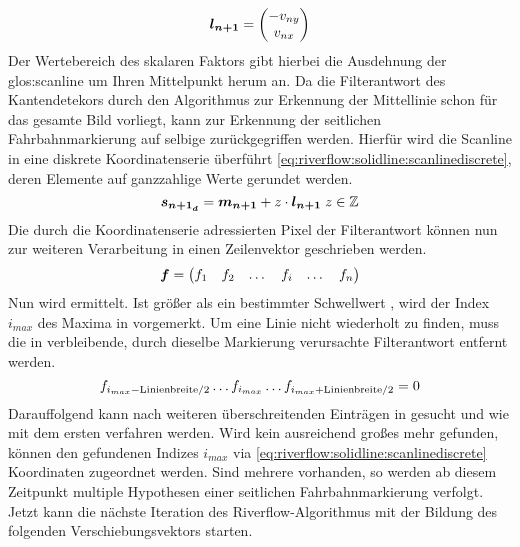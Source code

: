 \begin{equation}
\label{eq:riverflow:solidline:scanlinedirectionvec}
\boldsymbol{l_{n+1}} =
\begin{pmatrix}
-v_{ny} \\
v_{nx}
\end{pmatrix}
\end{equation}
Der Wertebereich des skalaren Faktors \scl{\alpha} gibt hierbei die Ausdehnung der \gls{glos:scanline} um Ihren Mittelpunkt  herum an.
Da die Filterantwort des Kantendetekors durch den Algorithmus zur Erkennung der Mittellinie schon für das gesamte Bild vorliegt, kann zur Erkennung der seitlichen Fahrbahnmarkierung auf selbige zurückgegriffen werden. Hierfür wird die Scanline in eine diskrete Koordinatenserie überführt \ref{eq:riverflow:solidline:scanlinediscrete}, deren Elemente auf ganzzahlige Werte gerundet werden.
\begin{equation}
\label{eq:riverflow:solidline:scanlinediscrete}
\boldsymbol{s_{{n+1}_d}} =
\boldsymbol{m_{n+1}}  + z \cdot \boldsymbol{l_{n+1}} 
\; z \in \mathbb{Z}
\end{equation}
Die durch die Koordinatenserie adressierten Pixel der Filterantwort können nun zur weiteren Verarbeitung in einen Zeilenvektor geschrieben werden. 
 \begin{equation}
 \boldsymbol{f} =
 \begin{pmatrix}
 f_1 & f_2 & \dots & f_i & \dots & f_n
 \end{pmatrix}
 \end{equation}
Nun wird  ermittelt. Ist  größer als ein bestimmter Schwellwert , wird der Index \begin{math} i_{max} \end{math} des Maxima in  vorgemerkt. Um eine Linie nicht wiederholt zu finden, muss die in  verbleibende, durch dieselbe Markierung verursachte Filterantwort entfernt  werden.
\begin{equation}
f_{i_{max}-\text{Linienbreite}/2} \dots f_{i_{max}} 
 \dots  f_{i_{max}+\text{Linienbreite}/2} = 0
 \end{equation}
Darauffolgend kann nach weiteren  überschreitenden Einträgen in  gesucht und wie mit dem ersten  verfahren werden.
Wird kein ausreichend großes  mehr gefunden, können den gefundenen Indizes \begin{math} i_{max} \end{math} via \eqref{eq:riverflow:solidline:scanlinediscrete} Koordinaten  zugeordnet werden.
Sind mehrere  vorhanden, so werden ab diesem Zeitpunkt multiple Hypothesen einer seitlichen Fahrbahnmarkierung verfolgt.
Jetzt kann die nächste Iteration des Riverflow-Algorithmus mit der Bildung des folgenden Verschiebungsvektors  starten.

